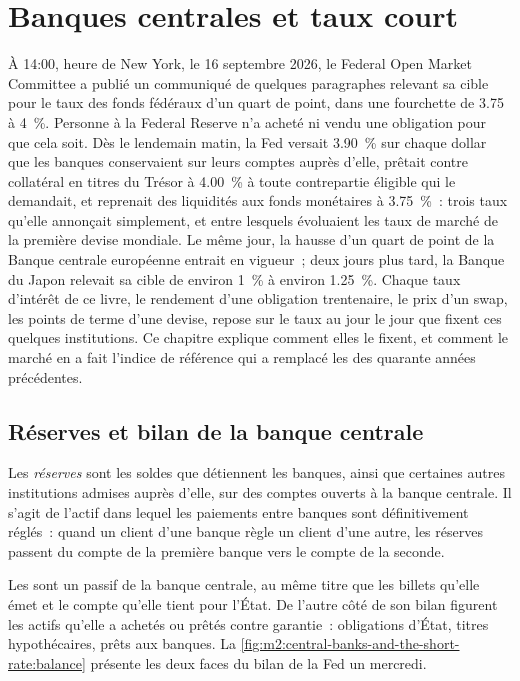 \chapter{Banques centrales et taux court}\label{ch:m2:central-banks-and-the-short-rate}

À 14:00, heure de New York, le 16 septembre 2026, le Federal Open Market
Committee a publié un communiqué de quelques paragraphes relevant sa cible pour
le taux des fonds fédéraux d'un quart de point, dans une fourchette de 3.75 à 4~\%.
Personne à la Federal Reserve n'a acheté ni vendu une obligation pour que cela soit. Dès le
lendemain matin, la Fed versait 3.90~\% sur chaque dollar que les banques conservaient
sur leurs comptes auprès d'elle, prêtait contre collatéral en titres du Trésor à 4.00~\% à
toute contrepartie éligible qui le demandait, et reprenait des liquidités aux fonds monétaires à 3.75~\%~: trois taux
qu'elle annonçait simplement, et entre lesquels évoluaient les taux de marché de la
première devise mondiale. Le même jour, la hausse d'un quart
de point de la Banque centrale européenne entrait en vigueur~; deux jours plus tard, la Banque du Japon relevait sa cible de
environ 1~\% à environ 1.25~\%. Chaque
taux d'intérêt de ce livre, le rendement d'une obligation trentenaire, le prix d'un
swap, les points de terme d'une devise, repose sur le taux au jour le jour
que fixent ces quelques institutions. Ce chapitre explique comment elles le fixent, et
comment le marché en a fait l'indice de référence qui a remplacé les  des quarante années précédentes.

\section{Réserves et bilan de la banque centrale}

\begin{definition}[Réserves]\label{def:m2:central-banks-and-the-short-rate:reserves}
Les \emph{réserves} sont les soldes que détiennent les banques, ainsi que certaines autres
institutions admises auprès d'elle, sur des comptes ouverts à la banque centrale. Il s'agit
de l'actif dans lequel les paiements entre banques sont définitivement réglés~: quand un
client d'une banque règle un client d'une autre, les réserves passent du compte de la
première banque vers le compte de la seconde.
\end{definition}

Les  sont un passif de la banque centrale, au même titre que les billets qu'elle émet et
le compte qu'elle tient pour l'État. De l'autre côté de son bilan
figurent les actifs qu'elle a achetés ou prêtés contre garantie~: obligations d'État, titres
hypothécaires, prêts aux banques. La \cref{fig:m2:central-banks-and-the-short-rate:balance}
présente les deux faces du bilan de la Fed un mercredi.

